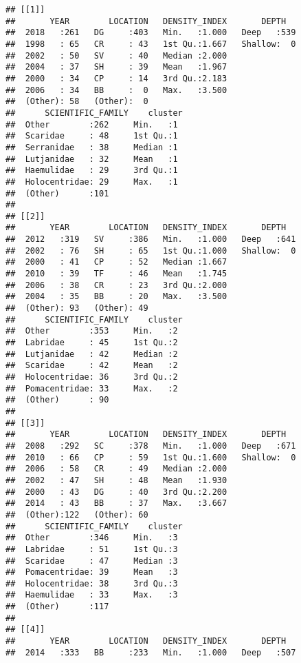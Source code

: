 \documentclass[
]{article}
\begin{document}
\begin{verbatim}
## [[1]]
##       YEAR        LOCATION   DENSITY_INDEX       DEPTH    
##  2018   :261   DG     :403   Min.   :1.000   Deep   :539  
##  1998   : 65   CR     : 43   1st Qu.:1.667   Shallow:  0  
##  2002   : 50   SV     : 40   Median :2.000                
##  2004   : 37   SH     : 39   Mean   :1.967                
##  2000   : 34   CP     : 14   3rd Qu.:2.183                
##  2006   : 34   BB     :  0   Max.   :3.500                
##  (Other): 58   (Other):  0                                
##      SCIENTIFIC_FAMILY    cluster 
##  Other        :262     Min.   :1  
##  Scaridae     : 48     1st Qu.:1  
##  Serranidae   : 38     Median :1  
##  Lutjanidae   : 32     Mean   :1  
##  Haemulidae   : 29     3rd Qu.:1  
##  Holocentridae: 29     Max.   :1  
##  (Other)      :101                
## 
## [[2]]
##       YEAR        LOCATION   DENSITY_INDEX       DEPTH    
##  2012   :319   SV     :386   Min.   :1.000   Deep   :641  
##  2002   : 76   SH     : 65   1st Qu.:1.000   Shallow:  0  
##  2000   : 41   CP     : 52   Median :1.667                
##  2010   : 39   TF     : 46   Mean   :1.745                
##  2006   : 38   CR     : 23   3rd Qu.:2.000                
##  2004   : 35   BB     : 20   Max.   :3.500                
##  (Other): 93   (Other): 49                                
##      SCIENTIFIC_FAMILY    cluster 
##  Other        :353     Min.   :2  
##  Labridae     : 45     1st Qu.:2  
##  Lutjanidae   : 42     Median :2  
##  Scaridae     : 42     Mean   :2  
##  Holocentridae: 36     3rd Qu.:2  
##  Pomacentridae: 33     Max.   :2  
##  (Other)      : 90                
## 
## [[3]]
##       YEAR        LOCATION   DENSITY_INDEX       DEPTH    
##  2008   :292   SC     :378   Min.   :1.000   Deep   :671  
##  2010   : 66   CP     : 59   1st Qu.:1.600   Shallow:  0  
##  2006   : 58   CR     : 49   Median :2.000                
##  2002   : 47   SH     : 48   Mean   :1.930                
##  2000   : 43   DG     : 40   3rd Qu.:2.200                
##  2014   : 43   BB     : 37   Max.   :3.667                
##  (Other):122   (Other): 60                                
##      SCIENTIFIC_FAMILY    cluster 
##  Other        :346     Min.   :3  
##  Labridae     : 51     1st Qu.:3  
##  Scaridae     : 47     Median :3  
##  Pomacentridae: 39     Mean   :3  
##  Holocentridae: 38     3rd Qu.:3  
##  Haemulidae   : 33     Max.   :3  
##  (Other)      :117                
## 
## [[4]]
##       YEAR        LOCATION   DENSITY_INDEX       DEPTH    
##  2014   :333   BB     :233   Min.   :1.000   Deep   :507  

\end{verbatim}
\end{document}
